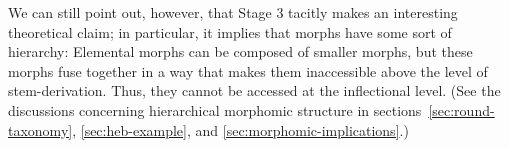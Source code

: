 
We can still point out, however, that Stage 3 tacitly makes an interesting theoretical claim; in particular, it implies that morphs have some sort of hierarchy: Elemental morphs can be composed of smaller morphs, but these morphs fuse together in a way that makes them inaccessible above the level of stem-derivation. Thus, they cannot be accessed at the inflectional level. (See the discussions concerning hierarchical morphomic structure in sections~\ref{sec:round-taxonomy}, \ref{sec:heb-example}, and \ref{sec:morphomic-implications}.) %

